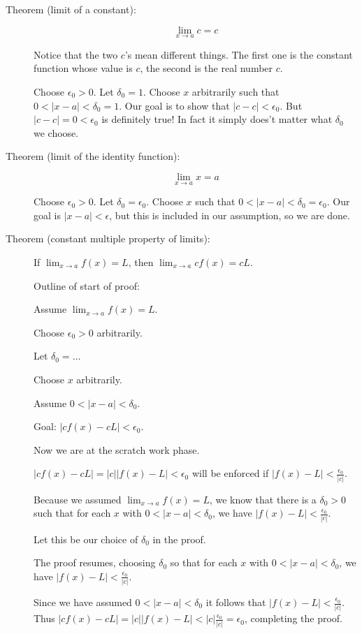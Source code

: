 \documentclass[12pt]{article}
\begin{document}
\begin{description}

\item[Theorem (limit of a constant):]  $$\lim_{x \rightarrow a} c=c$$

Notice that the two $c$'s mean different things.  The first one is the constant function whose value is $c$,
the second is the real number $c$.

Choose $\epsilon_0>0$.  Let $\delta_0=1$.  Choose $x$ arbitrarily such that $0<|x-a|<\delta_0=1$.
Our goal is to show that $|c-c|<\epsilon_0$.  But $|c-c|=0<\epsilon_0$ is definitely true!  In fact it simply
does't matter what $\delta_0$ we choose.

\item[Theorem (limit of the identity function):]  $$\lim_{x \rightarrow a} x=a$$

Choose $\epsilon_0>0$.  Let $\delta_0=\epsilon_0$.  Choose $x$ such that $0<|x-a|<\delta_0=\epsilon_0$.
Our goal is $|x-a|<\epsilon$, but this is included in our assumption, so we are done.

\item[Theorem (constant multiple property of limits):]  If $\lim_{x\rightarrow a} f(x)= L$, then $\lim_{x \rightarrow a} cf(x) = cL$.

Outline of start of proof:

Assume $\lim_{x\rightarrow a} f(x)= L$.

Choose $\epsilon_0>0$ arbitrarily.

Let $\delta_0 =\ldots$

Choose $x$ arbitrarily.

Assume $0<|x-a|<\delta_0$.

Goal:  $|cf(x)-cL|<\epsilon_0$.

Now we are at the scratch work phase.

$|cf(x)-cL|=|c||f(x)-L|<\epsilon_0$ will be enforced if $|f(x)-L|<\frac{\epsilon_0}{|c|}$.

Because we assumed $\lim_{x\rightarrow a} f(x)= L$, we know that there is a $\delta_0>0$ such that
for each $x$ with $0<|x-a|<\delta_0$, we have $|f(x)-L|<\frac{\epsilon_0}{|c|}$.

Let this be our choice of $\delta_0$ in the proof.

The proof resumes, choosing $\delta_0$ so that for each $x$ with $0<|x-a|<\delta_0$, we have $|f(x)-L|<\frac{\epsilon_0}{|c|}$.

Since we have assumed $0<|x-a|<\delta_0$ it follows that $|f(x)-L|<\frac{\epsilon_0}{|c|}$.  Thus
$|cf(x)-cL| = |c||f(x)-L| < |c|\frac{\epsilon_0}{|c|}=\epsilon_0$, completing the proof.


\end{description}
\end{document}
